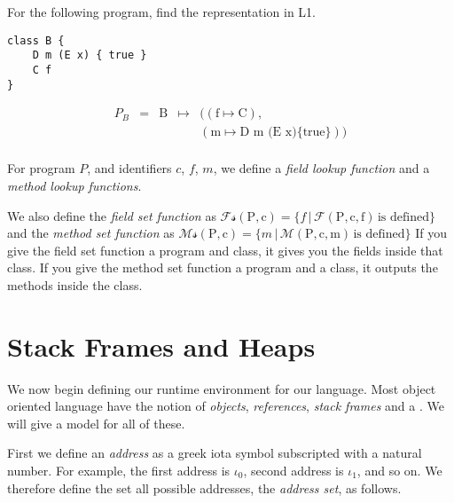 \begin{example}
For the following program, find the representation in L1.

\begin{lstlisting}
class B {
	D m (E x) { true }
	C f
}
\end{lstlisting}
\end{example}

\frmrule

\[ \begin{array}{lllll}
P_B & = & \text{B}   & \mapsto & ((\text{f} \mapsto \text{C}), \\ 
    &   &            &         &  (\text{m} \mapsto \text{D m (E x)}
                                    \{ \text{true} \})) \\
\end{array}\] 

\frmrule

For program $P$, and identiﬁers $c$, $f$, $m$, we define 
a \textit{field lookup function} and a \textit{method lookup functions}.


We also define the \textit{field set function} as 
$\mathcal{Fs}(\text{P},\text{c}) = \{ f\, |\, 
\mathcal{F}(\text{P},\text{c}, \text{f})\, \text{is defined} \}$
and the \textit{method set function} as
$\mathcal{Ms}(\text{P},\text{c}) = \{ m\, |\, 
\mathcal{M}(\text{P},\text{c}, \text{m})\, \text{is defined} \}$
If you give the field set function a program and class, it gives 
you the fields inside that class. If you give the method set 
function a program and a class, it outputs the methods inside the class. 

\section{Stack Frames and Heaps}

We now begin defining our runtime environment for our language. 
Most object oriented language have the notion of \textit{objects}, 
\textit{references}, \textit{stack frames} and a . 
We will give a model for all of these.

First we define an \textit{address} as a greek 
iota symbol subscripted with a natural number. 
For example, the first address is $\iota_0$, second address is $\iota_1$, and so on.
We therefore define the set all possible addresses, the \textit{address set}, as follows.

